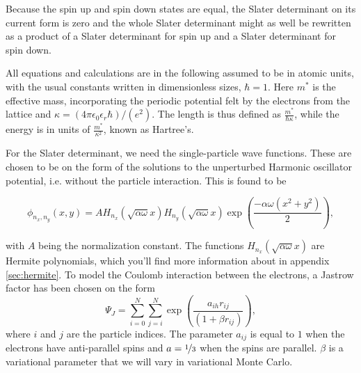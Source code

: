 \documentclass[aps,prb,twocolumn,floatfix]{revtex4}
\begin{document}

Because the spin up and spin down states are equal, the Slater determinant on its current form is zero and the whole Slater determinant might as well be rewritten as a product of a Slater determinant for spin up and a Slater determinant for spin down.

All equations and calculations are in the following assumed to be in atomic units, with the usual constants written in dimensionless sizes, $\hbar = 1$. Here $m^*$ is the effective mass, incorporating the periodic potential felt by the electrons from the lattice and $\kappa = (4\pi \epsilon_0 \epsilon_r \hbar)/(e^2)$. The length is thus defined as $\frac{m^{*}}{\hbar\kappa}$, while the energy is in units of $\frac{m^{*}}{\kappa^2}$, known as Hartree's\cite{larseivind}.

For the Slater determinant, we need the single-particle wave functions. These are chosen to be on the form of the solutions to the unperturbed Harmonic oscillator potential, i.e. without the particle interaction. This is found to be
\begin{widetext}
\begin{equation}
    \phi_{n_x,n_y}(x,y) = A H_{n_{x}}(\sqrt{\alpha \omega} x) H_{n_{y}}(\sqrt{\alpha \omega} x) \exp \left( \frac{- \alpha \omega \left( x^2 + y^2\right)}{2}\right),
\end{equation}
\end{widetext}
with $A$ being the normalization constant. The functions $H_{n_{x}}\left( \sqrt{\alpha \omega}x \right)$ are Hermite polynomials, which you'll find more information about in appendix \ref{sec:hermite}. To model the Coulomb interaction between the electrons, a Jastrow factor has been chosen on the form
\begin{equation}
    \Psi_J = \sum_{i=0}^{N} \sum_{j=i}^{N} \exp \left( \frac{a_{ih} r_{ij}}{(1 + \beta r_{ij})} \right),
\end{equation}
where $i$ and $j$ are the particle indices. The parameter $a_{ij}$ is equal to $1$ when the electrons have anti-parallel spins and $a = \nicefrac{1}{3}$ when the spins are parallel. $\beta$ is a variational parameter that we will vary in variational Monte Carlo.
\end{document}
